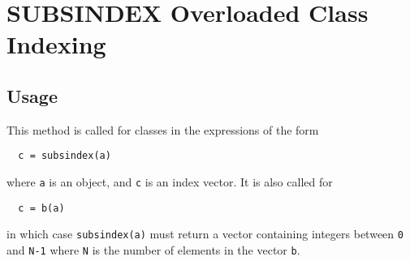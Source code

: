 \section{SUBSINDEX Overloaded Class Indexing}

\subsection{Usage}

This method is called for classes in the expressions
of the form
\begin{verbatim}
  c = subsindex(a)
\end{verbatim}
where \verb|a| is an object, and \verb|c| is an index vector.
It is also called for
\begin{verbatim}
  c = b(a)
\end{verbatim}
in which case \verb|subsindex(a)| must return a vector containing
integers between \verb|0| and \verb|N-1| where \verb|N| is the number
of elements in the vector \verb|b|.
